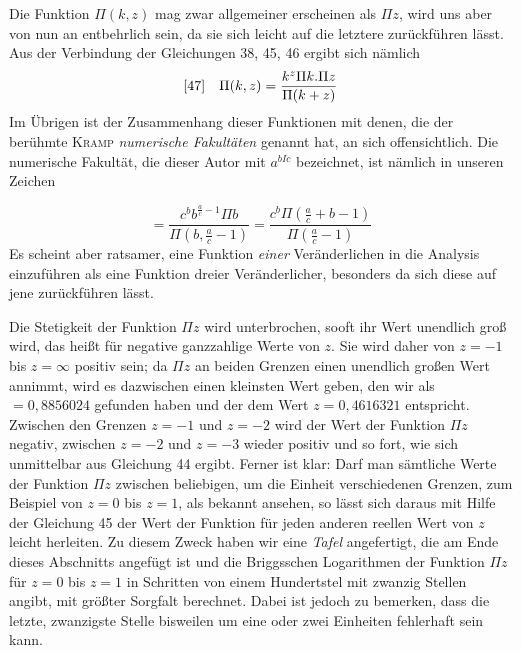 Die Funktion $\Pi(k,z)$ mag zwar allgemeiner erscheinen als $\Pi z$, wird uns aber von nun an entbehrlich sein, da sie sich leicht auf die letztere zurückführen lässt. Aus der Verbindung der Gleichungen 38, 45, 46 ergibt sich nämlich
\[
\begin{array}{@{}ll@{}}
[47]&\displaystyle\Pi(k,z)=\frac{k^z\Pi k.\Pi z}{\Pi(k+z)}
\end{array}
\]
Im Übrigen ist der Zusammenhang dieser Funktionen mit denen, die der berühmte \textsc{Kramp} \emph{numerische Fakultäten} genannt hat, an sich offensichtlich. Die numerische Fakultät, die dieser Autor mit
$a^{bIc}$
bezeichnet, ist nämlich in unseren Zeichen


\[
=\frac{c^b b^{\frac{a}{c}-1}\Pi b}{\Pi(b,\frac{a}{c}-1)}
=\frac{c^b\Pi(\frac{a}{c}+b-1)}{\Pi(\frac{a}{c}-1)}
\]
Es scheint aber ratsamer, eine Funktion \emph{einer} Veränderlichen in die Analysis einzuführen als eine Funktion dreier Veränderlicher, besonders da sich diese auf jene zurückführen lässt.

Die Stetigkeit der Funktion $\Pi z$ wird unterbrochen, sooft ihr Wert unendlich groß wird, das heißt für negative ganzzahlige Werte von $z$. Sie wird daher von $z=-1$ bis $z=\infty$ positiv sein; da $\Pi z$ an beiden Grenzen einen unendlich großen Wert annimmt, wird es dazwischen einen kleinsten Wert geben, den wir als $=0{,}8856024$ gefunden haben und der dem Wert $z=0{,}4616321$ entspricht. Zwischen den Grenzen $z=-1$ und $z=-2$ wird der Wert der Funktion $\Pi z$ negativ, zwischen $z=-2$ und $z=-3$ wieder positiv und so fort, wie sich unmittelbar aus Gleichung 44 ergibt. Ferner ist klar: Darf man sämtliche Werte der Funktion $\Pi z$ zwischen beliebigen, um die Einheit verschiedenen Grenzen, zum Beispiel von $z=0$ bis $z=1$, als bekannt ansehen, so lässt sich daraus mit Hilfe der Gleichung 45 der Wert der Funktion für jeden anderen reellen Wert von $z$ leicht herleiten. Zu diesem Zweck haben wir eine \emph{Tafel} angefertigt, die am Ende dieses Abschnitts angefügt ist und die Briggsschen Logarithmen der Funktion $\Pi z$ für $z=0$ bis $z=1$ in Schritten von einem Hundertstel mit zwanzig Stellen angibt, mit größter Sorgfalt berechnet. Dabei ist jedoch zu bemerken, dass die letzte, zwanzigste Stelle bisweilen um eine oder zwei Einheiten fehlerhaft sein kann.

